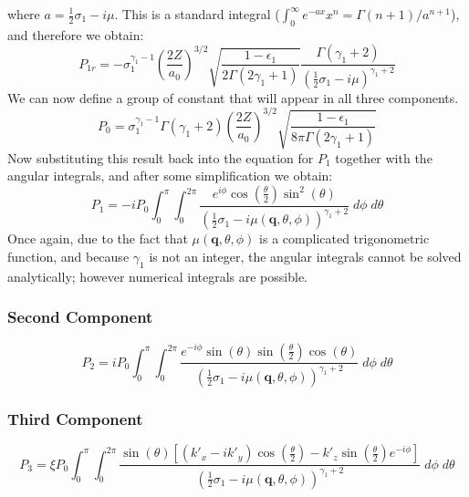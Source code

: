 \documentclass[a4paper,titlepage]{report}
\newcommand{\mb}[1]{\mathbf{#1}}
\begin{document}
	where $a = \frac{1}{2}\sigma_1 - i\mu$. This is a standard integral 
	($\int_0^\infty e^{-ax} x^n = \Gamma(n+1)/a^{n+1}$), and therefore
	we obtain:
	\begin{equation*}
	P_{1r} = -\sigma_1^{\gamma_1-1} \left( \frac{2Z}{a_0} \right)^{3/2}
			 \sqrt{\frac{1 - \epsilon_1}{2\Gamma(2\gamma_1 + 1)} }
			 \frac{\Gamma(\gamma_1 + 2)}{
			 	\left(
					\frac{1}{2} \sigma_1 - i\mu
				\right)^{\gamma_1 + 2}
			 }
	\end{equation*}
	We can now define a group of constant that will appear in all three
	components.
	\begin{equation*}
	\boxed{
		P_0 = \sigma_1^{\gamma_1 - 1} \Gamma(\gamma_1 + 2)
				\left( \frac{2Z}{a_0} \right)^{3/2}
				\sqrt{ \frac{1 - \epsilon_1}{8 \pi \Gamma(2\gamma_1 + 1)} }
	}
	\end{equation*}
	Now substituting this result back into the equation for $P_1$ together with
	the angular integrals, and after some simplification we obtain:
	\begin{equation}
	\boxed{
		P_1 = -i P_0
		\int_0^{\pi} \int_0^{2\pi}
			\frac{
				e^{i\phi} \cos\left( \frac{\theta}{2} \right) \sin^2(\theta)
			}{
				\left(
					\frac{1}{2}\sigma_1 - i\mu(\mb{q},\theta,\phi)
				\right)^{\gamma_1 + 2}
			}
		\; d\phi \; d\theta
	}
	\end{equation}
	Once again, due to the fact that $\mu(\mb{q},\theta,\phi)$ is a complicated
	trigonometric function, and because $\gamma_1$ is not an integer, the
	angular integrals cannot be solved analytically; however numerical integrals
	are possible.

	\subsubsection{Second Component}
	\begin{equation}
	\boxed{
	P_2 = i P_0
		  \int_0^{\pi} \int_0^{2\pi}
		  	\frac{
				e^{-i \phi} 
				\sin(\theta) \sin\left(\frac{\theta}{2}\right) \cos(\theta)
			}{
				\left(
					\frac{1}{2}\sigma_1 - i\mu( \mb{q},\theta,\phi)
				\right)^{\gamma_1 + 2}
			}
		  \; d\phi \; d\theta
	}
	\end{equation}

	\subsubsection{Third Component}
	\begin{equation}
	\boxed{
	P_3 = \xi P_0
		  \int_0^{\pi} \int_0^{2\pi}
		  	\frac{
				\sin( \theta)
				\left[
					(k'_x - ik'_y) \cos \left( \frac{\theta}{2} \right)
					- k'_z \sin \left( \frac{\theta}{2} \right) e^{-i\phi}
				\right]
			}{
				\left( 
					\frac{1}{2} \sigma_1 - i\mu( \mb{q},\theta,\phi)
				\right)^{\gamma_1 + 2}
			}
		  \; d\phi \; d\theta
	}
	\end{equation}
\end{document}
